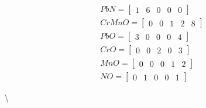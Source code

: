 \documentclass[
]{article}
\begin{document}
\begin{align*}

    PbN = \begin{bmatrix}
        1&6&0&0&0
    \end{bmatrix} \\

    CrMnO = \begin{bmatrix}
        0&0&1&2&8
    \end{bmatrix} \\

    PbO = \begin{bmatrix}
        3&0&0&0&4
    \end{bmatrix} \\

    CrO = \begin{bmatrix}
        0&0&2&0&3
    \end{bmatrix} \\

    MnO = \begin{bmatrix}
        0&0&0&1&2
    \end{bmatrix} \\

    NO = \begin{bmatrix}
        0&1&0&0&1
    \end{bmatrix}

\end{align*}

\rightarrow



\textbackslash{}

\end{document}
